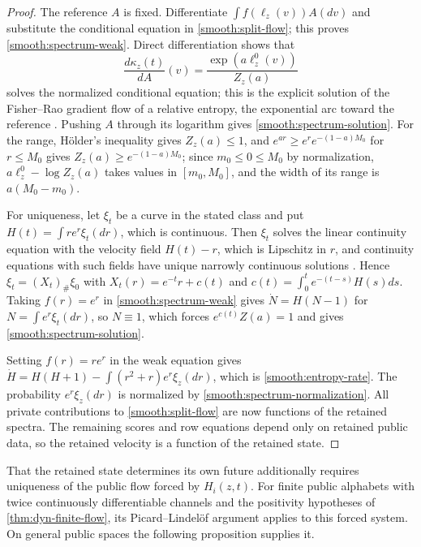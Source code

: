 \begin{proof}
The reference $A$ is fixed. Differentiate $\int f(\ell_z(v))A(dv)$ and substitute the conditional equation in \cref{smooth:split-flow}; this proves \cref{smooth:spectrum-weak}. Direct differentiation shows that
\begin{equation}
 \frac{d\kappa_z(t)}{dA}(v)
 =\frac{\exp(a\ell_z^0(v))}{Z_z(a)}
 \label{smooth:conditional-solution}
\end{equation}
solves the normalized conditional equation; this is the explicit solution of the Fisher--Rao gradient flow of a relative entropy, the exponential arc toward the reference \citep{ChenEtAl2023}. Pushing $A$ through its logarithm gives \cref{smooth:spectrum-solution}. For the range, H\"older's inequality gives $Z_z(a)\leq1$, and $e^{ar}\geq e^re^{-(1-a)M_0}$ for $r\leq M_0$ gives $Z_z(a)\geq e^{-(1-a)M_0}$; since $m_0\leq0\leq M_0$ by normalization, $a\ell_z^0-\log Z_z(a)$ takes values in $[m_0,M_0]$, and the width of its range is $a(M_0-m_0)$.

For uniqueness, let $\xi_t$ be a curve in the stated class and put $H(t)=\int re^r\xi_t(dr)$, which is continuous. Then $\xi_t$ solves the linear continuity equation with the velocity field $H(t)-r$, which is Lipschitz in $r$, and continuity equations with such fields have unique narrowly continuous solutions \citep[Sec.~8.1]{AmbrosioGigliSavare2008}. Hence $\xi_t=(X_t)_\#\xi_0$ with $X_t(r)=e^{-t}r+c(t)$ and $c(t)=\int_0^te^{-(t-s)}H(s)ds$. Taking $f(r)=e^r$ in \cref{smooth:spectrum-weak} gives $\dot N=H(N-1)$ for $N=\int e^r\xi_t(dr)$, so $N\equiv1$, which forces $e^{c(t)}Z(a)=1$ and gives \cref{smooth:spectrum-solution}.

Setting $f(r)=re^r$ in the weak equation gives
$\dot H=H(H+1)-\int(r^2+r)e^r\xi_z(dr)$, which is \cref{smooth:entropy-rate}. The probability $e^r\xi_z(dr)$ is normalized by \cref{smooth:spectrum-normalization}. All private contributions to \cref{smooth:split-flow} are now functions of the retained spectra. The remaining scores and row equations depend only on retained public data, so the retained velocity is a function of the retained state.
\end{proof}

That the retained state determines its own future additionally requires uniqueness of the public flow forced by $H_i(z,t)$. For finite public alphabets with twice continuously differentiable channels and the positivity hypotheses of \cref{thm:dyn-finite-flow}, its Picard--Lindel\"of argument applies to this forced system. On general public spaces the following proposition supplies it.

